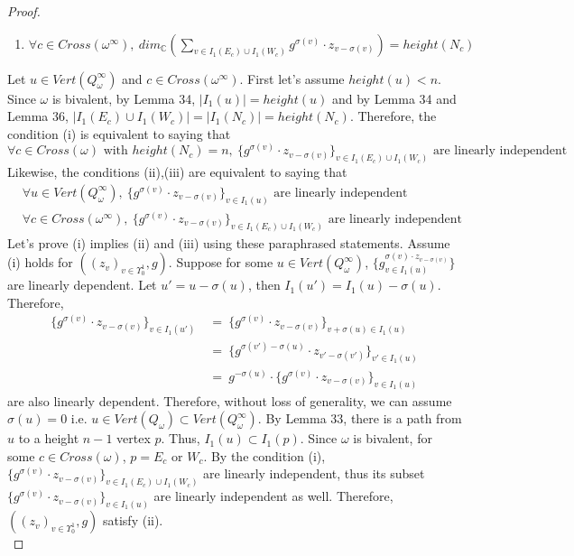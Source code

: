 \begin{proof}
\begin{enumerate}[label = (\roman*)]
\item $\forall c\in Cross(\omega^\infty),~dim_\mathbb{C}(\sum_{v\in I_1(E_c)\cup I_1(W_c)} g^{\sigma(v)}\cdot z_{v-\sigma(v)}) = height(N_c)$
\end{enumerate}
Let $u\in Vert(Q_\omega^\infty)$ and $c\in Cross(\omega^\infty)$. First let's assume $height(u)<n$. Since $\omega$ is bivalent, by Lemma 34, $|I_1(u)|=height(u)$ and by Lemma 34 and Lemma 36, $|I_1(E_c)\cup I_1(W_c)| = |I_1(N_c)| = height(N_c)$. Therefore, the condition (\Rn{1}) is equivalent to saying that 
\[
\forall c\in Cross(\omega) \text{ with } height(N_c) = n, ~\{g^{\sigma(v)}\cdot z_{v-\sigma(v)}\}_{v\in I_1(E_c)\cup I_1(W_c)}
\text{ are linearly independent}\] 
Likewise, the conditions (\Rn{2}),(\Rn{3}) are equivalent to saying that 
\begin{align*}
&\forall u\in Vert(Q_\omega^\infty), ~\{g^{\sigma(v)}\cdot z_{v-\sigma(v)}\}_{v\in I_1(u)} \text{ are linearly independent} \\
&\forall c\in Cross(\omega^\infty), ~\{g^{\sigma(v)}\cdot z_{v-\sigma(v)}\}_{v\in I_1(E_c)\cup I_1(W_c)}\text{ are linearly independent}
\end{align*}
Let's prove (\Rn{1}) implies (\Rn{2}) and (\Rn{3}) using these paraphrased statements. Assume (\Rn{1}) holds for $((z_v)_{v\in \Upsilon_0^1},g)$. Suppose for some $u\in Vert(Q_\omega^\infty)$, $\{g^{\sigma(v)\cdot z_{v-\sigma(v)}}_{v\in I_1(u)}\}$ are linearly dependent. Let $u' = u-\sigma(u)$, then $I_1(u')=I_1(u)-\sigma(u)$. Therefore, 
\begin{align*}
\{g^{\sigma(v)}\cdot z_{v-\sigma(v)}\}_{v\in I_1(u')}~&=~\{g^{\sigma(v)}\cdot z_{v-\sigma(v)}\}_{v+\sigma(u)\in I_1(u)}\\
&=~\{g^{\sigma(v')-\sigma(u)}\cdot z_{v'-\sigma(v')}\}_{v'\in I_1(u)} \\
&=~g^{-\sigma(u)}\cdot\{g^{\sigma(v)}\cdot z_{v-\sigma(v)}\}_{v\in I_1(u)}
\end{align*}
are also linearly dependent. Therefore, without loss of generality, we can assume $\sigma(u) = 0$ i.e. $u\in Vert(Q_\omega)\subset Vert(Q_\omega^\infty)$. By Lemma 33, there is a path from $u$ to a height $n-1$ vertex $p$. Thus, $I_1(u)\subset I_1(p)$. Since $\omega$ is bivalent, for some $c\in Cross(\omega)$, $p=E_c\text{ or }W_c$. By the condition (\Rn{1}), $\{g^{\sigma(v)}\cdot z_{v-\sigma(v)}\}_{v\in I_1(E_c)\cup I_1(W_c)}$ are linearly independent, thus its subset $\{g^{\sigma(v)}\cdot z_{v-\sigma(v)}\}_{v\in I_1(u)}$ are linearly independent as well. Therefore, $((z_v)_{v\in\Upsilon_0^1},g)$ satisfy (\Rn{2}).\\

\end{proof}
